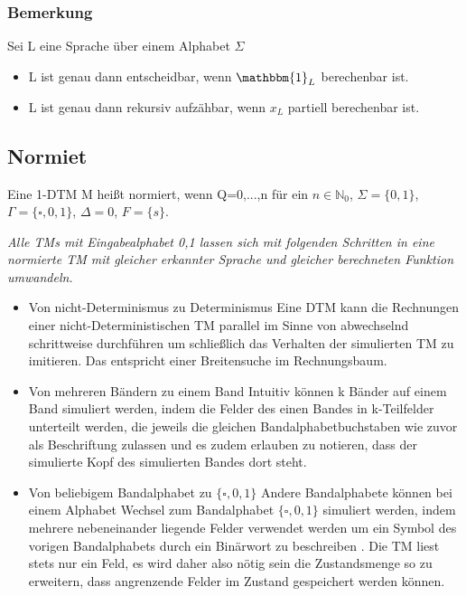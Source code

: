     \subsubsection*{Bemerkung}
        Sei L eine Sprache über einem Alphabet \(\Sigma\)
        \begin{itemize}
            \item L ist genau dann entscheidbar, wenn $\mathbbm{1}_L$ berechenbar ist.
            \item L ist genau dann rekursiv aufzähbar, wenn $x_L$ partiell berechenbar ist.
        \end{itemize}
\subsection{Normiet}
    Eine 1-DTM M heißt normiert, wenn Q={0,...,n} für ein \(n\in\mathbb{N}_0\), \(\Sigma=\{0,1\}\), \(\Gamma=\{\square,0,1\}\), \(\Delta=0\), \(F=\{s\}\).\par\bigskip
    \textit{
        Alle TMs mit Eingabealphabet {0,1} lassen sich mit folgenden Schritten in eine normierte TM mit gleicher erkannter Sprache und gleicher berechneten Funktion umwandeln.}
    \begin{itemize}
        \item Von nicht-Determinismus zu Determinismus
            \subitem Eine DTM kann die Rechnungen einer nicht-Deterministischen TM parallel im Sinne von abwechselnd schrittweise durchführen 
            um schließlich das Verhalten der simulierten TM zu imitieren.
            Das entspricht einer Breitensuche im Rechnungsbaum.
        \item Von mehreren Bändern zu einem Band
            \subitem Intuitiv können k Bänder auf einem Band simuliert werden, indem die Felder des einen Bandes in k-Teilfelder unterteilt werden, 
            die jeweils die gleichen Bandalphabetbuchstaben wie zuvor als Beschriftung zulassen und es zudem erlauben zu notieren, dass der simulierte Kopf des simulierten Bandes dort steht.  
        \item Von beliebigem Bandalphabet zu \(\{\square,0,1\}\)
        \subitem Andere Bandalphabete können bei einem Alphabet Wechsel zum Bandalphabet \(\{\square,0,1\}\) simuliert werden, 
        indem mehrere nebeneinander liegende Felder verwendet werden um ein Symbol des vorigen Bandalphabets durch ein Binärwort zu beschreiben .
        Die TM liest stets nur ein Feld, es wird daher also nötig sein die Zustandsmenge so zu erweitern, dass angrenzende Felder im Zustand gespeichert werden können.
    \end{itemize}
